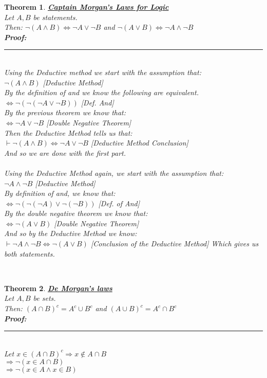 \documentclass[12pt]{extarticle}
\theoremstyle{plain}
\newtheorem{thm}{Theorem}[section]
\theoremstyle{plain}
\theoremstyle{plain}
\theoremstyle{Definition}
\theoremstyle{Definition}
\theoremstyle{plain}
\theoremstyle{plain}
\newcommand{\cut}[0]{\noindent\framebox[\linewidth]{\rule{\linewidth}{2pt}}\\}
\newcommand{\prof}[0]{	\noindent \textbf{Proof:} \rule{500pt}{2pt} \\ }
\begin{document}
\begin{thm} \underline{\textbf{Captain Morgan's Laws for Logic}} \\ 
	Let $A,B$ be statements. \\ 
	Then: $\lnot(A \land B) \Leftrightarrow \lnot A \lor \lnot B$ and $\lnot(A \lor B) \Leftrightarrow \lnot A \land \lnot B$ \\
	\prof
	Using the Deductive method we start with the assumption that: \\
	$\lnot(A \land B)$ \hfill [Deductive Method] \\
	By the definition of and we know the following are equivalent. \\ 
	$ \Leftrightarrow \lnot( \lnot( \lnot A \lor \lnot B) )$ \hfill [Def. And] \\ 
	By the previous theorem we know that: \\ 
	$ \Leftrightarrow \lnot A \lor \lnot B$ \hfill [Double Negative Theorem] \\ 
	Then the Deductive Method tells us that: \\ 
	$\vdash \lnot(A \land B) \Leftrightarrow \lnot A \lor \lnot B$ \hfill [Deductive Method Conclusion] \\
	And so we are done with the first part. \\ \\
	Using the Deductive Method again, we start with the assumption that: \\ 
	$\lnot A \land \lnot B$ \hfill [Deductive Method] \\
	By definition of and, we know that: \\ 
	$\Leftrightarrow \lnot (\lnot (\lnot A) \lor \lnot (\lnot B)) $ \hfill [Def. of And] \\ 
	By the double negative theorem we know that: \\ 
	$\Leftrightarrow \lnot (A \lor B)$ \hfill [Double Negative Theorem] \\
	And so by the Deductive Method we know: \\ 
	$\vdash \lnot A \land \lnot B \Leftrightarrow \lnot (A \lor B)$ \hfill [Conclusion of the Deductive Method]
	Which gives us both statements. 
\end{thm}
\cut
\begin{thm} \underline{\textbf{De Morgan's laws}} \\
	Let $A,B$ be sets. \\ 
	Then: $(A \cap B)^c = A^c \cup B^c$ and $(A \cup B)^c = A^c \cap B^c$ \\ 
	\prof 
	Let $x \in (A \cap B)^c \Rightarrow x \not \in A \cap B$ \\ 
	$\Rightarrow \lnot(x \in A \cap B)$ \\ 
	$\Rightarrow \lnot(x \in A \land x \in B)$  
\end{thm}
\end{document}
